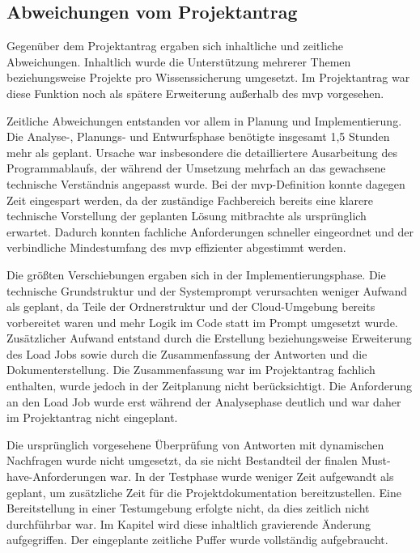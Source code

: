 \documentclass[
  10pt,
  ngerman,
  a4paper,
  toc=graduated,
  numbers=noenddot,
  headings=standardclasses,
  nonumberlist
]{scrartcl}
\begin{document}
\subsection{Abweichungen vom Projektantrag}
\label{abweichungen_vom_projektantrag}
Gegenüber dem Projektantrag ergaben sich inhaltliche und zeitliche Abweichungen. Inhaltlich wurde die Unterstützung mehrerer Themen beziehungsweise Projekte pro Wissenssicherung umgesetzt. Im Projektantrag war diese Funktion noch als spätere Erweiterung außerhalb des \gls{mvp} vorgesehen.

Zeitliche Abweichungen entstanden vor allem in Planung und Implementierung. Die Analyse-, Planungs- und Entwurfsphase benötigte insgesamt 1,5 Stunden mehr als geplant. Ursache war insbesondere die detailliertere Ausarbeitung des Programmablaufs, der während der Umsetzung mehrfach an das gewachsene technische Verständnis angepasst wurde. Bei der \gls{mvp}-Definition konnte dagegen Zeit eingespart werden, da der zuständige Fachbereich bereits eine klarere technische Vorstellung der geplanten Lösung mitbrachte als ursprünglich erwartet. Dadurch konnten fachliche Anforderungen schneller eingeordnet und der verbindliche Mindestumfang des \gls{mvp} effizienter abgestimmt werden.

Die größten Verschiebungen ergaben sich in der Implementierungsphase. Die technische Grundstruktur und der Systemprompt verursachten weniger Aufwand als geplant, da Teile der Ordnerstruktur und der Cloud-Umgebung bereits vorbereitet waren und mehr Logik im Code statt im Prompt umgesetzt wurde. Zusätzlicher Aufwand entstand durch die Erstellung beziehungsweise Erweiterung des Load Jobs sowie durch die Zusammenfassung der Antworten und die Dokumenterstellung. Die Zusammenfassung war im Projektantrag fachlich enthalten, wurde jedoch in der Zeitplanung nicht berücksichtigt. Die Anforderung an den Load Job wurde erst während der Analysephase deutlich und war daher im Projektantrag nicht eingeplant.

Die ursprünglich vorgesehene Überprüfung von Antworten mit dynamischen Nachfragen wurde nicht umgesetzt, da sie nicht Bestandteil der finalen Must-have-Anforderungen war. In der Testphase wurde weniger Zeit aufgewandt als geplant, um zusätzliche Zeit für die Projektdokumentation bereitzustellen. Eine Bereitstellung in einer Testumgebung erfolgte nicht, da dies zeitlich nicht durchführbar war. Im Kapitel  wird diese inhaltlich gravierende Änderung aufgegriffen. Der eingeplante zeitliche Puffer wurde vollständig aufgebraucht.
\end{document}

